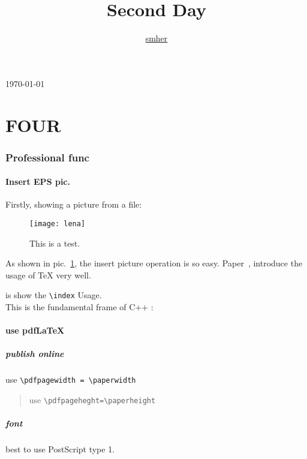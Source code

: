 \documentclass[a4paper, 11pt, titlepage]{article}
\title{Second Day}
\author{\href{smhhaoo@126.com}{smher}}
\begin{document}
\maketitle
\tableofcontents
\today

\printindex

\newpage
\part{FOUR}
\section{Professional func}
\subsection{Insert EPS pic.}

Firstly, showing a picture from a file:

\begin{figure}[!hbp]\label{pic1}
\centering
\texttt{[image: lena]}
\caption{This is a test.}
\end{figure}

As shown in pic.~\ref{pic1}, the insert picture operation is so easy. Paper~\cite{pa}, introduce the usage of \TeX{} very well. 

 is show the \verb|\index| Usage. \\

This is the fundamental frame of C++ : \\


\rightmark
\leftmark

\subsection{use pdf\LaTeX}
\subsubsection{publish online}
	use \verb|\pdfpagewidth = \paperwidth|
\begin{quote}
use \verb|\pdfpageheght=\paperheight|
\end{quote}
\subsubsection{font}
 best to use PostScript type 1.
\end{document}

